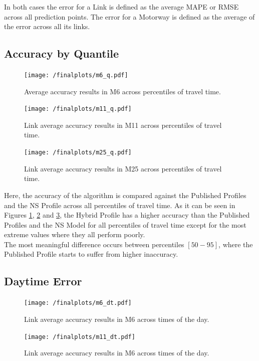 \documentclass[conference, letterpaper]{IEEEtran}
\begin{document}
In both cases the error for a Link is defined as the average MAPE or RMSE across all prediction points.
The error for a Motorway is defined as the average of the error across all its links.
\subsection{Accuracy by Quantile}
\begin{figure}[htbp]
	\centerline{\texttt{[image: /finalplots/m6\_q.pdf]}}
	\caption{Average accuracy results in M6 across percentiles of travel time.}
	\label{fig:m6q}
\end{figure}

\begin{figure}[htbp]
	\centering
	\texttt{[image: /finalplots/m11\_q.pdf]}
	\caption{Link average accuracy results in M11 across percentiles of travel time.}
	\label{fig:m11q}
\end{figure}

\begin{figure}[htbp]
	\centering
	\texttt{[image: /finalplots/m25\_q.pdf]}
	\caption{Link average accuracy results in M25 across percentiles of travel time.}
	\label{fig:m25q}
\end{figure}
Here, the accuracy of the algorithm is compared against the Published Profiles and the NS Profile across all percentiles of travel time.
As it can be seen in Figures \ref{fig:m6q}, \ref{fig:m11q} and \ref{fig:m25q}, the Hybrid Profile has a higher accuracy than the Published Profiles and the NS Model for all percentiles of travel time except for the most extreme values where they all perform poorly.\\
The most meaningful difference occurs between percentiles $[50-95]$, where the Published Profile starts to suffer from higher inaccuracy.

\subsection{Daytime Error}
\begin{figure}[htbp]
	\centering
		\texttt{[image: /finalplots/m6\_dt.pdf]}
	\caption{Link average accuracy results in M6 across times of the day.}
	\label{fig:m6daytime}
\end{figure}

\begin{figure}[htbp]
	\centering
	\texttt{[image: /finalplots/m11\_dt.pdf]}
	\caption{Link average accuracy results in M6 across times of the day.}
	\label{fig:m11daytime}
\end{figure}
\end{document}
